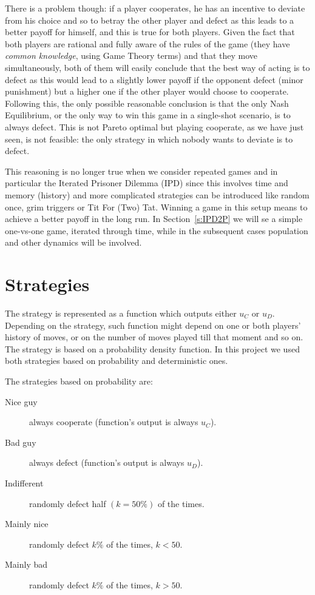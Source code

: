 \documentclass[journal,a4paper,10pt,twoside]{IEEEtran} %
\begin{document}
There is a problem though: if a player cooperates, he has an incentive to deviate from his choice and so to betray the other player and defect as this leads to a better payoff for himself, and this is true for both players. 
Given the fact that both players are rational and fully aware of the rules of the game (they have \textit{common knowledge}, using Game Theory terms) and that they move simultaneously, both of them will easily conclude that the best way of acting is to defect as this would lead to a slightly lower payoff if the opponent defect (minor punishment) but a higher one if the other player would choose to cooperate.
Following this, the only possible reasonable conclusion is that the only Nash Equilibrium, or the only way to win this game in a single-shot scenario, is to always defect.
This is not Pareto optimal but playing cooperate, as we have just seen, is not feasible: the only strategy in which nobody wants to deviate is to defect.

This reasoning is no longer true when we consider repeated games and in particular the Iterated Prisoner Dilemma (IPD) since this involves time and memory (history) and more complicated strategies can be introduced like random once, grim triggers or Tit For (Two) Tat.
Winning a game in this setup means to achieve a better payoff in the long run. In Section~\ref{s:IPD2P} we will se a simple one-vs-one game, iterated through time, while in the subsequent cases population and other dynamics will be involved.

\section{Strategies} \label{s:str}
The strategy is represented as a function which outputs either $u_C$ or $u_D$. Depending on the strategy, such function might depend on one or both players' history of moves, or on the number of moves played till that moment and so on.
The strategy is based on a probability density function. In this project we used both strategies based on probability and deterministic ones.

The strategies based on probability are:

\begin{description}
    \item[Nice guy] always cooperate (function's output is always $u_C$).
    \item[Bad guy] always defect (function's output is always $u_D$).
    \item[Indifferent] randomly defect half $(k=50\%)$ of the times.
    \item[Mainly nice] randomly defect $k\%$ of the times, $k<50$.%
    \item[Mainly bad] randomly defect $k\%$ of the times, $k>50$.%
\end{description}
\end{document}
